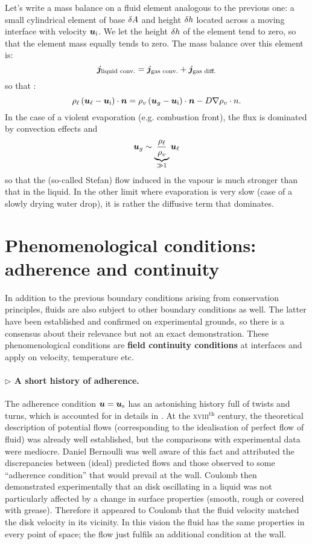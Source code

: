 Let's write a mass balance on a fluid element analogous to the previous one: a small cylindrical element of base $\delta A$ and height $\delta h$ located across a moving interface with velocity $\bu_\text i$. We let the height $\delta h$ of the element tend to zero, so that the element mass equally tends to zero. The mass balance over this element is:
\begin{equation}
\bj_\text{liquid conv.} = \bj_\text{gas conv.} + \bj_\text{gas diff.}
\end{equation}
so that :
\begin{equation}
\rho_\ell \lp\bu_\ell - \bu_\text i\rp \cdot \bn = \rho_v \lp\bu_g -\bu_\text i\rp\cdot \bn - D \nabla \rho_v \cdot n.
\end{equation}
In the case of a violent evaporation (e.g. combustion front), the flux is dominated by convection effects and 
$$\bu_g \sim \underbrace{\frac{\rho_\ell}{\rho_v}}_{\gg 1} \bu_\ell$$
so that the (so-called Stefan) flow induced in the vapour is much stronger than that in the liquid.
In the other limit where evaporation is very slow (case of a slowly drying water drop), it is rather the diffusive term that dominates.
\section{Phenomenological conditions: adherence and continuity}
In addition to the previous boundary conditions arising from conservation principles, fluids are also subject to other boundary conditions as well. The latter have been established and confirmed on experimental grounds, so there is a consensus about their relevance but not an exact demonstration. These phenomenological conditions are \textbf{field continuity conditions} at interfaces and apply on velocity, temperature etc.

\paragraph{$\rhd$ A short history of adherence.} The adherence condition $\bu = \bu_\mathrm{s}$ has an astonishing history full of twists and turns, which is accounted for in details in \citet{Goldstein1950}. At the \textsc{xviii}$^\text{th}$ century, the theoretical description of potential flows (corresponding to the idealisation of perfect flow of fluid) was already well established, but the comparisons with experimental data were mediocre. Daniel Bernoulli was well aware of this fact and attributed the discrepancies between (ideal) predicted flows and those observed to some ``adherence condition'' that would prevail at the wall. Coulomb then demonstrated experimentally that an disk oscillating in a liquid was not particularly affected by a change in surface properties (smooth, rough or covered with grease). Therefore it appeared to Coulomb that the fluid velocity matched the disk velocity in its vicinity. In this vision the fluid has the same properties in every point of space; the flow just fulfils an additional condition at the wall.

